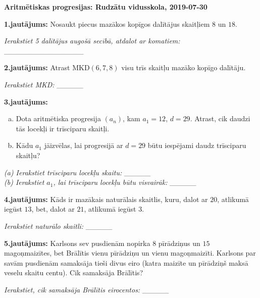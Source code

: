 \documentclass[11pt]{article}
\newenvironment{uzdevums}[1][\unskip]{%
\vspace{3mm}
\noindent
\textbf{#1:}
\noindent}
{}
\begin{document}
\thispagestyle{empty}

{\Large \bf Aritmētiskas progresijas: Rudzātu vidusskola, 2019-07-30}


\begin{uzdevums}[1.jautājums]
Nosaukt piecus mazākos kopīgos dalītājus skaitļiem 
$8$ un $18$. 
\end{uzdevums}

\vspace{2ex}
{\em Ierakstiet 5 dalītājus augošā secībā, atdalot ar komatiem:} \_\_\_\_\_\_\_\_\_\_\_\_\_\_\_

\vspace{6ex}
\begin{uzdevums}[2.jautājums]
Atrast $\mbox{MKD}(6,7,8)$ \textendash{} visu trīs skaitļu mazāko kopīgo dalītāju.
\end{uzdevums}

\vspace{2ex}
{\em Ierakstiet MKD:} \_\_\_\_\_

\vspace{6ex}
\begin{uzdevums}[3.jautājums]
\begin{enumerate}[(a)]
\item Dota aritmētiska progresija $(a_n)$, kam $a_1 = 12$, $d = 29$. 
Atrast, cik daudzi tās locekļi ir trīsciparu skaitļi.  
\item Kādu $a_1$ jāizvēlas, lai progresijā ar $d=29$ būtu iespējami 
daudz trīsciparu skaitļu?
\end{enumerate}
\end{uzdevums}

\vspace{2ex}
{\em (a) Ierakstiet trīsciparu locekļu skaitu:} \_\_\_\_\_\\

\noindent
{\em (b) Ierakstiet $a_1$, lai trīsciparu locekļu būtu visvairāk:} \_\_\_\_\_

\vspace{6ex}
\begin{uzdevums}[4.jautājums]
Kāds ir mazākais naturālais skaitlis, kuru, dalot ar $20$, atlikumā iegūst $13$, 
bet, dalot ar $21$, atlikumā iegūst $3$.
\end{uzdevums}

\vspace{2ex}
{\em Ierakstiet naturālo skaitli:} \_\_\_\_\_

\vspace{6ex}
\begin{uzdevums}[5.jautājums]
Karlsons sev pusdienām nopirka $8$ pīrādziņus un $15$ magoņmaizītes, bet
Brālītis \textendash{} vienu pīrādziņu un vienu magoņmaizīti. Karlsons par savām
pusdienām samaksāja tieši divus eiro (katra maizīte un pīrādziņš maksā veselu
skaitu centu). Cik samaksāja Brālītis?
\end{uzdevums}

\vspace{2ex}
{\em Ierakstiet, cik samaksāja Brālītis eirocentos:} \_\_\_\_\_
\end{document}
